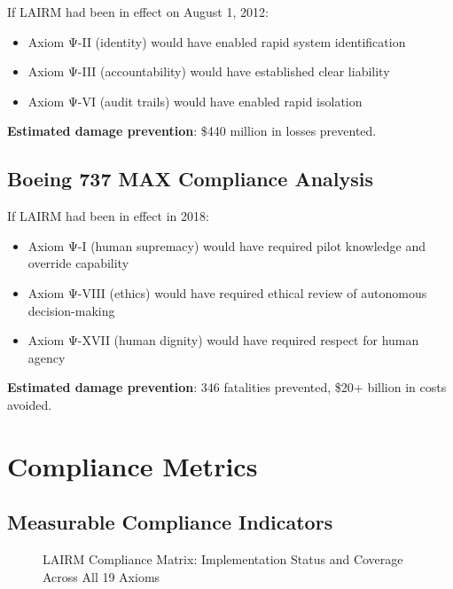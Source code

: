 \documentclass[12pt,a4paper,twoside,openright]{book}
\begin{document}
If LAIRM had been in effect on August 1, 2012:

\begin{itemize}
    \item Axiom Ψ-II (identity) would have enabled rapid system identification
    \item Axiom Ψ-III (accountability) would have established clear liability
    \item Axiom Ψ-VI (audit trails) would have enabled rapid isolation
\end{itemize}

\textbf{Estimated damage prevention}: \$440 million in losses prevented.

\subsection{Boeing 737 MAX Compliance Analysis}

If LAIRM had been in effect in 2018:

\begin{itemize}
    \item Axiom Ψ-I (human supremacy) would have required pilot knowledge and override capability
    \item Axiom Ψ-VIII (ethics) would have required ethical review of autonomous decision-making
    \item Axiom Ψ-XVII (human dignity) would have required respect for human agency
\end{itemize}

\textbf{Estimated damage prevention}: 346 fatalities prevented, \$20+ billion in costs avoided.

\section{Compliance Metrics}

\subsection{Measurable Compliance Indicators}

\begin{figure}[h]
\centering

\caption{LAIRM Compliance Matrix: Implementation Status and Coverage Across All 19 Axioms}
\label{fig:compliance-matrix}
\end{figure}
\end{document}
